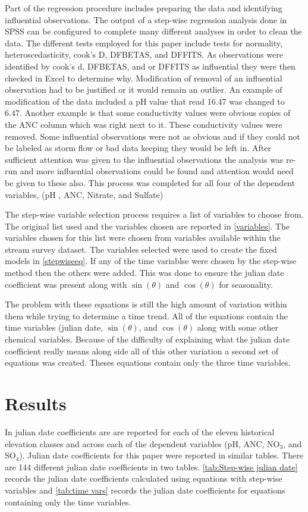  Part of the regression procedure includes preparing the data and  identifying influential observations.  The output of a step-wise regression analysis done in SPSS can be configured to complete many different analyses in order to clean the data.  The different tests employed for this paper include tests for normality, heteroscedasticity, cook's D, DFBETAS, and DFFITS.  As observations were identified by cook's d, DFBETAS, and or DFFITS as influential they were then checked in Excel to determine why.  Modification of removal of an influential observation had to be justified or it would remain an outlier.  An example of modification of the data included a pH value that read 16.47 was changed to 6.47.  Another example is that some conductivity values were obvious copies of the ANC column which was right next to it.  These conductivity values were removed.   Some influential observations were not as obvious and if they could not be labeled as storm flow or bad data keeping they would be left in.  After sufficient attention was given to the influential observations the analysis was re-run and more influential observations could be found and attention would need be given to these also.  This process was completed for all four of the dependent variables, (pH , ANC, Nitrate, and Sulfate)
 
 The step-wise variable selection process requires a list of variables to choose from.  The original list used and the variables chosen are reported in \autoref{variables}.  The variables chosen for this list were chosen from variables available within the stream survey dataset.   The variables selected were used to create the fixed models in \autoref{stepwiseeq}.  If any of the time variablse were chosen by the step-wise method then the others were added.  This was done to ensure the julian date coefficient was present along with $\sin(\theta)$ and $\cos(\theta)$ for seasonality.
 
 The problem with these equations is still the high amount of variation within them while trying to determine a time trend.  All of the equations contain the time variables (julian date, $\sin(\theta)$, and $\cos(\theta)$ along with some other chemical variables.  Because of the difficulty of explaining what the julian date coefficient really means along side all of this other variation a second set of equations was created.  Theses equations contain only the three time variables.
 
\section{Results}
In \citet{robinson2008ph} julian date coefficients are are reported for each of the eleven historical elevation classes and across each of the dependent variables (pH, ANC, NO$_3$, and SO$_4$).  Julian date coefficients for this paper were reported in similar tables.  There are 144 different julian date coefficients in two tables.  \autoref{tab:Step-wise julian date} records the julian date coefficients calculated using equations with step-wise variables and \autoref{tab:time vars} records the julian date coefficients for  equations containing only the time variables.

